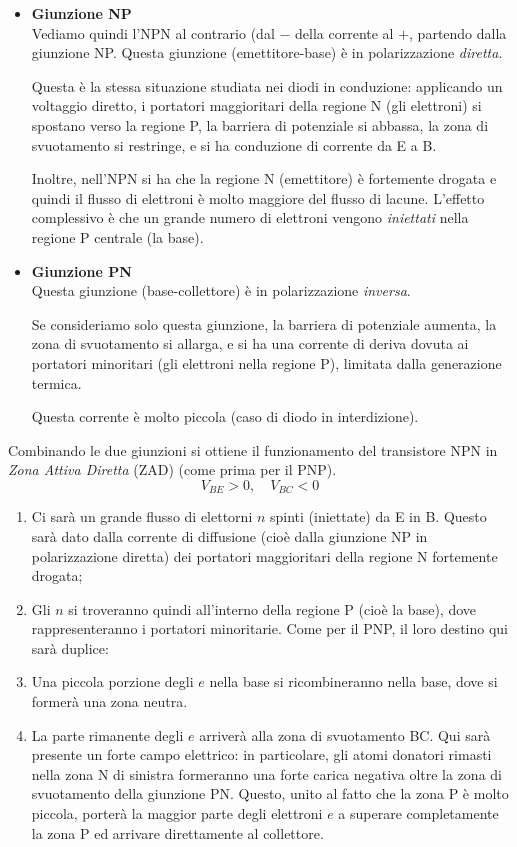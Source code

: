 \documentclass[a4paper,11pt]{article}
\begin{document}
\begin{itemize}
\item \textbf{\textsf{Giunzione NP}} \\
Vediamo quindi l'NPN al contrario (dal $-$ della corrente al $+$, partendo dalla giunzione NP.
Questa giunzione (emettitore-base) è in polarizzazione \textit{diretta}.

Questa è la stessa situazione studiata nei diodi in conduzione: applicando un voltaggio diretto, i portatori maggioritari della regione N (gli elettroni) si spostano verso la regione P, la barriera di potenziale si abbassa, la zona di svuotamento si restringe, e si ha conduzione di corrente da E a B.

Inoltre, nell’NPN si ha che la regione N (emettitore) è fortemente drogata e quindi il flusso di elettroni è molto maggiore del flusso di lacune. L’effetto complessivo è che un grande numero di elettroni vengono \textit{iniettati} nella regione P centrale (la base).

\item \textbf{\textsf{Giunzione PN}} \\
Questa giunzione (base-collettore) è in polarizzazione \textit{inversa}.

Se consideriamo solo questa giunzione, la barriera di potenziale aumenta, la zona di svuotamento si allarga, e si ha una corrente di deriva dovuta ai portatori minoritari (gli elettroni nella regione P), limitata dalla generazione termica.

Questa corrente è molto piccola (caso di diodo in interdizione).
\end{itemize}

Combinando le due giunzioni si ottiene il funzionamento del transistore NPN in \textit{Zona Attiva Diretta} (ZAD) (come prima per il PNP). 
$$
V_{BE} > 0, \quad V_{BC} < 0
$$
\begin{enumerate}
	\item Ci sarà un grande flusso di elettorni $n$ spinti (iniettate) da E in B. Questo sarà dato dalla corrente di diffusione (cioè dalla giunzione NP in polarizzazione diretta) dei portatori maggioritari della regione N fortemente drogata;
	\item Gli $n$ si troveranno quindi all'interno della regione P (cioè la base), dove rappresenteranno i portatori minoritarie. Come per il PNP, il loro destino qui sarà duplice:
	\item Una piccola porzione degli $e$ nella base si ricombineranno nella base, dove si formerà una zona neutra. 
	\item La parte rimanente degli $e$ arriverà alla zona di svuotamento BC. Qui sarà presente un forte campo elettrico: in particolare, gli atomi donatori rimasti nella zona N di sinistra formeranno una forte carica negativa oltre la zona di svuotamento della giunzione PN. Questo, unito al fatto che la zona P è molto piccola, porterà la maggior parte degli elettroni $e$ a superare completamente la zona P ed arrivare direttamente al collettore. 
\end{enumerate}
\end{document}
